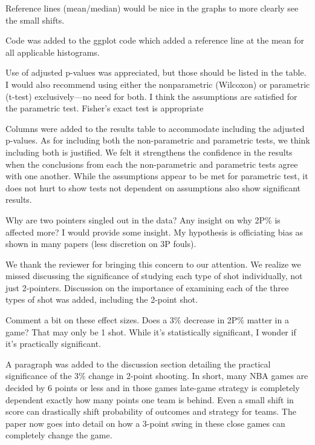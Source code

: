 \documentclass[12pt]{article}
\newenvironment{comment}%
{\begin{quoting}\noindent\small\it\ignorespaces%
  }{\end{quoting}}
\begin{document}
\begin{comment}
  Reference lines (mean/median) would be nice in the graphs to more clearly see the small shifts.
\end{comment}

 Code was added to the ggplot code which added a reference line at the mean for all applicable histograms.
 
\begin{comment}
Use of adjusted p-values was appreciated, but those should be listed in the table.  I would also recommend using either the nonparametric (Wilcoxon) or parametric (t-test) exclusively—no need for both.  I think the assumptions are satisfied for the parametric test.  Fisher’s exact test is appropriate
\end{comment}

 Columns were added to the results table to accommodate including the adjusted p-values. As for including both the non-parametric and parametric tests, we think including both is justified. We felt it strengthens the confidence in the results when the conclusions from each the non-parametric and parametric tests agree with one another. While the assumptions appear to be met for parametric test, it does not hurt to show tests not dependent on assumptions also show significant results.
 
\begin{comment}
 Why are two pointers singled out in the data? Any insight on why 2P\% is affected more? I would provide some insight. My hypothesis is officiating bias as shown in many papers (less discretion on 3P fouls). 
\end{comment}

 We thank the reviewer for bringing this concern to our attention. We realize we missed discussing the significance of studying each type of shot individually, not just 2-pointers. Discussion on the importance of examining each of the three types of shot was added, including the 2-point shot.

\begin{comment}
Comment a bit on these effect sizes. Does a 3\% decrease in 2P\% matter in a game? That may only be 1 shot. While it's statistically significant, I wonder if it's practically significant.
\end{comment}

 A paragraph was added to the discussion section detailing the practical significance of the 3\% change in 2-point shooting. In short, many NBA games are decided by 6 points or less and in those games late-game strategy is completely dependent exactly how many points one team is behind. Even a small shift in score can drastically shift probability of outcomes and strategy for teams. The paper now goes into detail on how a 3-point swing in these close games can completely change the game.
\end{document}
